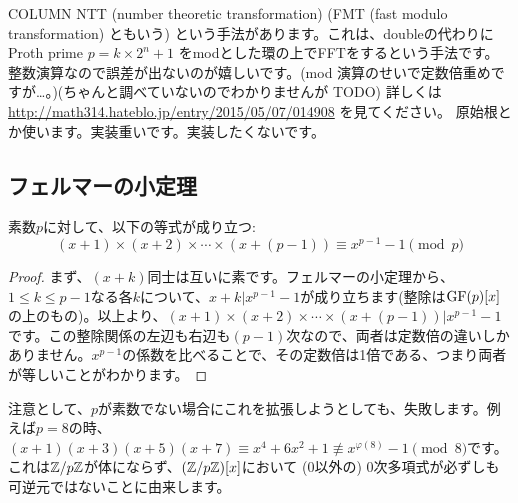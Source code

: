 \documentclass{jsarticle}
\begin{document}
  \begin{itembox}[l]{COLUMN}
   NTT (number theoretic transformation) (FMT (fast modulo transformation) ともいう) という手法があります。これは、doubleの代わりに Proth prime $p = k \times 2^n + 1$ をmodとした環の上でFFTをするという手法です。
   整数演算なので誤差が出ないのが嬉しいです。(mod 演算のせいで定数倍重めですが…。)(ちゃんと調べていないのでわかりませんが TODO)
   詳しくは\url{http://math314.hateblo.jp/entry/2015/05/07/014908} を見てください。
   原始根とか使います。実装重いです。実装したくないです。
  \end{itembox}
  \subsection{フェルマーの小定理~}
  \begin{theorem}
   \label{thm:polynomial-fermat}
   素数$p$に対して、以下の等式が成り立つ:
   \begin{displaymath}
    (x+1) \times (x+2) \times \cdots \times (x + (p - 1)) \equiv x^{p-1} - 1 \pmod p
   \end{displaymath}
  \end{theorem}
  \begin{proof}
  まず、$(x+k)$同士は互いに素です。フェルマーの小定理から、$1 \le k \le p - 1$なる各$k$について、$x + k | x^{p-1} - 1$が成り立ちます(整除は$\mathrm{GF}(p)[x]$の上のもの)。以上より、$(x+1) \times (x+2) \times \cdots \times (x + (p - 1)) | x^{p-1}-1$です。この整除関係の左辺も右辺も$(p-1)$次なので、両者は定数倍の違いしかありません。$x^{p-1}$の係数を比べることで、その定数倍は1倍である、つまり両者が等しいことがわかります。
  \end{proof}
  注意として、$p$が素数でない場合にこれを拡張しようとしても、失敗します。例えば$p=8$の時、$(x+1)(x+3)(x+5)(x+7) \equiv x^4 + 6x^2 + 1 \not \equiv x^{\varphi(8)}-1 \pmod 8$です。これは$\mathbb{Z}/p\mathbb{Z}$が体にならず、$(\mathbb{Z}/p\mathbb{Z})[x]$において (0以外の) 0次多項式が必ずしも可逆元ではないことに由来します。
\end{document}
